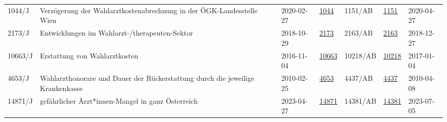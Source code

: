 \documentclass[landscape]{article}
\begin{document}
\begin{longtable}{@{}p{1.5cm}p{4cm}p{2cm}p{2.5cm}p{1.5cm}p{2.5cm}p{2cm}@{}}
1044/J & Verzögerung der Wahlarztkostenabrechnung in der ÖGK-Landesstelle Wien & 2020-02-27 & \href{https://www.parlament.gv.at/gegenstand/XXVII/J/1044}{1044} & 1151/AB & \href{https://www.parlament.gv.at/gegenstand/XXVII/AB/1151}{1151} & 2020-04-27 \\
2173/J & Entwicklungen im Wahlarzt-/therapeuten-Sektor & 2018-10-29 & \href{https://www.parlament.gv.at/gegenstand/XXVI/J/2173}{2173} & 2163/AB & \href{https://www.parlament.gv.at/gegenstand/XXVI/AB/2163}{2163} & 2018-12-27 \\
10663/J & Erstattung von Wahlarztkosten & 2016-11-04 & \href{https://www.parlament.gv.at/gegenstand/XXV/J/10663}{10663} & 10218/AB & \href{https://www.parlament.gv.at/gegenstand/XXV/AB/10218}{10218} & 2017-01-04 \\
4653/J & Wahlarzthonorare und Dauer der Rückerstattung durch die jeweilige Krankenkasse & 2010-02-25 & \href{https://www.parlament.gv.at/gegenstand/XXIV/J/4653}{4653} & 4437/AB & \href{https://www.parlament.gv.at/gegenstand/XXIV/AB/4437}{4437} & 2010-04-08 \\
14871/J & gefährlicher Ärzt*innen-Mangel in ganz Österreich & 2023-04-27 & \href{https://www.parlament.gv.at/gegenstand/XXVII/J/14871}{14871} & 14381/AB & \href{https://www.parlament.gv.at/gegenstand/XXVII/AB/14381}{14381} & 2023-07-05 \\
\bottomrule
\end{longtable}
\end{document}

